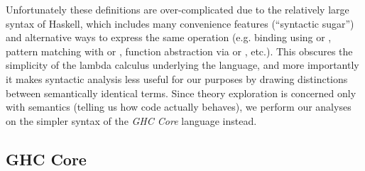 Unfortunately these definitions are over-complicated due to the relatively large
syntax of Haskell, which includes many convenience features (``syntactic
sugar'') and alternative ways to express the same operation (e.g. binding using
 or , pattern matching with  or , function
abstraction via  or , etc.). This obscures the
simplicity of the lambda calculus underlying the language, and more importantly
it makes syntactic analysis less useful for our purposes by drawing distinctions
between semantically identical terms. Since theory exploration is concerned only
with semantics (telling us how code actually behaves), we perform our analyses
on the simpler syntax of the \emph{GHC Core} language instead.

\subsection{GHC Core}\label{sec:core}
\label{sec:ghccore}

